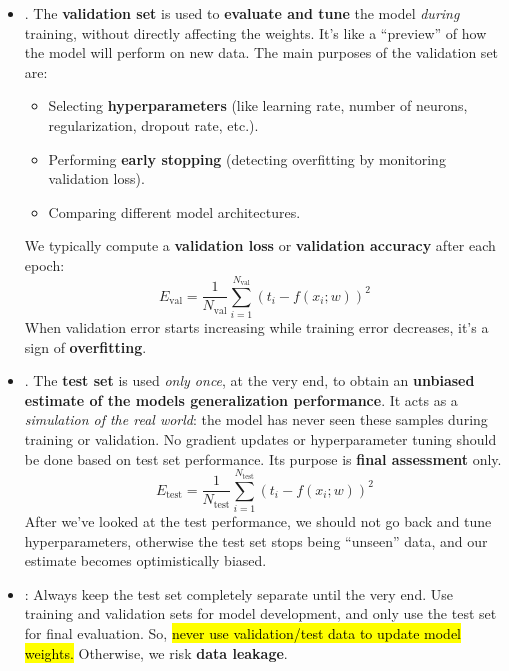 \begin{itemize}
    \item {}. The \textbf{validation set} is used to \textbf{evaluate and tune} the model \emph{during} training, without directly affecting the weights. It's like a ``preview'' of how the model will perform on new data. The main purposes of the validation set are:
    \begin{itemize}
        \item Selecting \textbf{hyperparameters} (like learning rate, number of neurons, regularization, dropout rate, etc.).
        \item Performing \textbf{early stopping} (detecting overfitting by monitoring validation loss).
        \item Comparing different model architectures.
    \end{itemize}
    We typically compute a \textbf{validation loss} or \textbf{validation accuracy} after each epoch:
    \begin{equation*}
        E_{\text{val}} = \dfrac{1}{N_{\text{val}}} \sum_{i=1}^{N_{\text{val}}} \left(t_{i} - f\left(x_i; w\right)\right)^{2}
    \end{equation*}
    When validation error starts increasing while training error decreases, it's a sign of \textbf{overfitting}.

    \item {}. The \textbf{test set} is used \emph{only once}, at the very end, to obtain an \textbf{unbiased estimate of the models generalization performance}. It acts as a \emph{simulation of the real world}: the model has never seen these samples during training or validation. No gradient updates or hyperparameter tuning should be done based on test set performance. Its purpose is \textbf{final assessment} only.
    \begin{equation*}
        E_{\text{test}} = \dfrac{1}{N_{\text{test}}} \sum_{i=1}^{N_{\text{test}}} \left(t_{i} - f\left(x_i; w\right)\right)^{2}
    \end{equation*}
    After we've looked at the test performance, we should not go back and tune hyperparameters, otherwise the test set stops being ``unseen'' data, and our estimate becomes optimistically biased.

    \item {}: Always keep the test set completely separate until the very end. Use training and validation sets for model development, and only use the test set for final evaluation. So, \hl{never use validation/test data to update model weights.} Otherwise, we risk \textbf{data leakage}.
\end{itemize}

